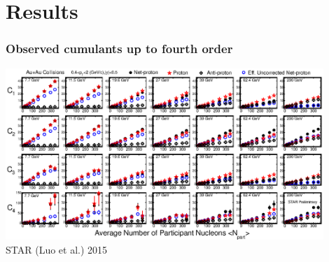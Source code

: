 \documentclass[accentcolor=tud2c,usenames,dvipsnames,colorbacktitle,inverttitle,landscape,german,presentation,t]{tudbeamer}
\begin{document}
  \section{Results}

  \begin{frame}
    \frametitle{Observed cumulants up to fourth order}
    \begin{center}
      \includegraphics[width=0.9\textwidth]{figures/11/Cumulants}
      \\\footnotesize{STAR (Luo et al.) 2015}
    \end{center}
  \end{frame}
\end{document}
